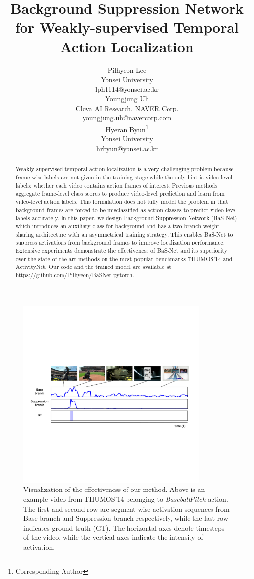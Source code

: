 \documentclass[letterpaper]{article} %
\title{Background Suppression Network \\for Weakly-supervised Temporal Action Localization}
\author{%
  Pilhyeon Lee\\
  Yonsei University\\
  lph1114@yonsei.ac.kr \\
  \And
  Youngjung Uh \\
  Clova AI Research, NAVER Corp. \\
  youngjung.uh@navercorp.com \\
  \And
  Hyeran Byun\thanks{Corresponding Author} \\
  Yonsei University\\
  hrbyun@yonsei.ac.kr \\
}
\begin{document}
\maketitle

\begin{abstract}
Weakly-supervised temporal action localization is a very challenging problem because frame-wise labels are not given in the training stage while the only hint is video-level labels: whether each video contains action frames of interest.
Previous methods aggregate frame-level class scores to produce video-level prediction and learn from video-level action labels. This formulation does not fully model the problem in that background frames are forced to be misclassified as action classes to predict video-level labels accurately.
In this paper, we design Background Suppression Network (BaS-Net) which introduces an auxiliary class for background and has a two-branch weight-sharing architecture with an asymmetrical training strategy. This enables BaS-Net to suppress activations from background frames to improve localization performance.
Extensive experiments demonstrate the effectiveness of BaS-Net and its superiority over the state-of-the-art methods on the most popular benchmarks  THUMOS'14 and ActivityNet. Our code and the trained model are available at \href{https://github.com/Pilhyeon/BaSNet-pytorch}{https://github.com/Pilhyeon/BaSNet-pytorch}.
\end{abstract}

\begin{figure}[t]
  \centering
  \includegraphics[width=0.85\textwidth]{figure_1.pdf}
  \caption{
  Visualization of the effectiveness of our method.
  Above is an example video from THUMOS'14 belonging to \textit{BaseballPitch} action. The first and second row are segment-wise activation sequences from Base branch and Suppression branch respectively, while the last row indicates ground truth (GT).
  The horizontal axes denote timesteps of the video, while the vertical axes indicate the intensity of activation.
  }
  \label{fig:intro_figure}
\end{figure}
\end{document}
